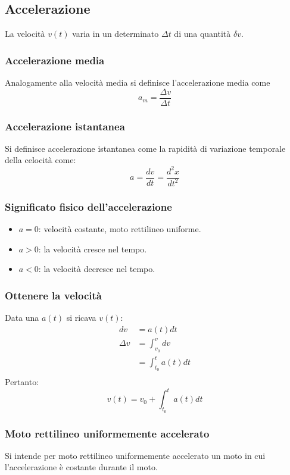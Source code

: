 	\subsection{Accelerazione}
	La velocit\`a $v(t)$ varia in un determinato $\Delta t$ di una quantit\`a $\delta v$.

		\subsubsection{Accelerazione media}
		Analogamente alla velocit\`a media si definisce l'accelerazione media come
		$$a_m = \dfrac{\Delta v}{\Delta t}$$

		\subsubsection{Accelerazione istantanea}
		Si definisce accelerazione istantanea come la rapidit\`a di variazione temporale della celocit\`a come:
		$$a = \dfrac{dv}{dt} = \dfrac{d^2 x}{dt^2}$$

		\subsubsection{Significato fisico dell'accelerazione}
		\begin{multicols}{2}
			\begin{itemize}
				\item $a=0$: velocit\`a costante, moto rettilineo uniforme.
				\item $a>0$: la velocit\`a cresce nel tempo.
				\item $a<0$: la velocit\`a decresce nel tempo.
			\end{itemize}
		\end{multicols}

		\subsubsection{Ottenere la velocit\`a}
		Data una $a(t)$ si ricava $v(t)$:
		\begin{align*}
			dv &=a(t)dt\\
			\Delta v &= \int_{v_0}^v dv\\
			   &=\int_{t_0}^t a(t)dt\\
		\end{align*}
		Pertanto:
		$$v(t) = v_0 + \int_{t_0}^t a(t)dt$$

		\subsubsection{Moto rettilineo uniformemente accelerato}
		Si intende per moto rettilineo uniformemente accelerato un moto in cui l'accelerazione \`e costante durante il moto.

